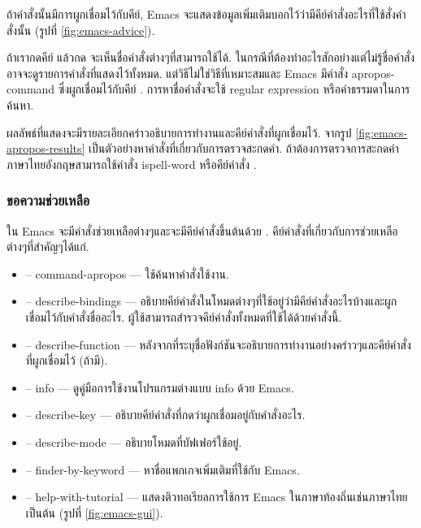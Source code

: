 \begin{thwbr}
ถ้าคำสั่งนั้นมีการผูกเชื่อมไว้กับคีย์, Emacs จะแสดงข้อมูลเพิ่มเติมบอกไว้ว่ามีคีย์คำสั่งอะไรที่ใช้สั่งคำสั่งนั้น (รูปที่ \ref{fig:emacs-advice}).

\begin{figure}[!hbt]
\end{figure}

ถ้าเรากดคีย์  แล้วกด   จะเห็นชื่อคำสั่งต่างๆที่สามารถใช้ได้. ในกรณีที่ต้องทำอะไรสักอย่างแต่ไม่รู้ชื่อคำสั่งอาจจะดูรายการคำสั่งที่แสดงไว้ทั้งหมด. แต่วิธีไม่ใช่วิธีที่เหมาะสมและ Emacs มีคำสั่ง apropos-command ซึ่งผูกเชื่อมไว้กับคีย์ . การหาชื่อคำสั่งจะใช้ regular expression หรือคำธรรมดาในการค้นหา. 

\begin{figure}[!hbt]
\end{figure}

ผลลัพธ์ที่แสดงจะมีรายละเอียกคร่าวอธิบายการทำงานและคีย์คำสั่งที่ผูกเชื่อมไว้. จากรูป \ref{fig:emacs-apropos-results} เป็นตัวอย่างหาคำสั่งที่เกี่ยวกับการตรวจสะกดคำ. ถ้าต้องการตรวจการสะกดคำภาษาไทยอังกฤษสามารถใช้คำสั่ง ispell-word หรือคีย์คำสั่ง . 


\subsubsection{ขอความช่วยเหลือ}
ใน Emacs จะมีคำสั่งช่วยเหลือต่างๆและจะมีคีย์คำสั่งขึ้นต้นด้วย . คีย์คำสั่งที่เกี่ยวกับการช่วยเหลือต่างๆที่สำคัญๆได้แก่.
\begin{itemize}
\item {} -- command-apropos --- ใช้ค้นหาคำสั่งใช้งาน.
\item {} -- describe-bindings --- อธิบายคีย์คำสั่งในโหมดต่างๆที่ใช้อยู่ว่ามีคีย์คำสั่งอะไรบ้างและผูกเชื่อมไว้กับคำสั่งชื่ออะไร. ผู้ใช้สามารถสำรวจคีย์คำสั่งทั้งหมดที่ใช้ได้ด้วยคำสั่งนี้.
\item {} -- describe-function --- หลังจากที่ระบุชื่อฟังก์ชันจะอธิบายการทำงานอย่างคร่าวๆและคีย์คำสั่งที่ผูกเชื่อมไว้ (ถ้ามี).
\item {} -- info --- ดูคู่มือการใช้งานโปรแกรมต่างแบบ info ด้วย Emacs.
\item {} -- describe-key --- อธิบายคีย์คำสั่งที่กดว่าผูกเชื่อมอยู่กับคำสั่งอะไร.
\item {} -- describe-mode --- อธิบายโหมดที่บัฟเฟอร์ใช้อยู่.
\item {} -- finder-by-keyword --- หาชื่อแพกเกจเพิ่มเติมที่ใช้กับ Emacs.
\item {} -- help-with-tutorial --- แสดงติวทอเรียลการใช้การ Emacs ในภาษาท้องถิ่นเช่นภาษาไทยเป็นต้น (รูปที่ \ref{fig:emacs-gui}). 
\end{itemize}



\end{thwbr}
